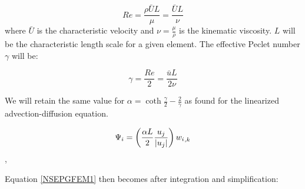 \begin{equation}
 Re = \frac{\rho\bar{U}L}{\mu}  =\frac{\bar{U}L}{\nu}
\end{equation}
where $\bar{U}$ is the characteristic velocity and $\nu=\frac{\mu}{\rho}$ is the kinematic viscosity. $L$ will be the characteristic length scale for a given element. The effective Peclet number $\gamma$ will be:

\begin{equation}
  \gamma= \frac{Re}{2}  = \frac{\bar{u}L}{2\nu}
\end{equation}

We will retain the same value for $\alpha={\coth{\frac{\gamma}{2}} - \frac{2}{\gamma}}$ as found for the linearized advection-diffusion equation. 

\begin{equation}
 \label{PGTest}
  \Psi_i = \left( \frac{\alpha{L}}{2}{\frac{u_j}{\left| u_j \right|}} \right){ {w_{i}}_{,k} }
\end{equation},


Equation \eqref{NSEPGFEM1} then becomes after integration and simplification:


